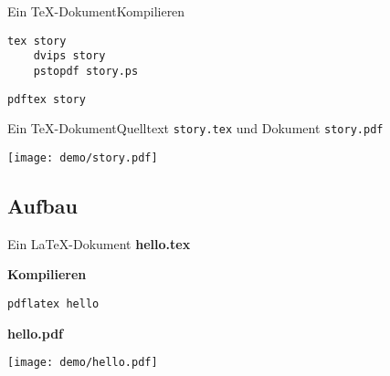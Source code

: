 \begin{Frame}[fragile]{Ein \TeX-Dokument}{Kompilieren}
  \begin{lstlisting}[language={},morekeywords={tex,dvips,pstopdf},gobble=4]
    tex story
    dvips story
    pstopdf story.ps
  \end{lstlisting}

  \xxx
  \pause


  \begin{lstlisting}[language={},morekeywords={pdftex},gobble=4]
    pdftex story
  \end{lstlisting}
\end{Frame}

\begin{Frame}[t]{Ein \TeX-Dokument}{Quelltext \texttt{story.tex} und Dokument \texttt{story.pdf}}
  

  \begin{center}
    \texttt{[image: demo/story.pdf]}
  \end{center}
\end{Frame}

\subsection{Aufbau}

\begin{Frame}[fragile,t]{Ein \LaTeX-Dokument}
  \textbf{\ttfamily\color{maincolor}hello.tex}
  

  \pause
  \xxx

  \textbf{\color{maincolor}Kompilieren}
  \begin{lstlisting}[language={},morekeywords={pdflatex},gobble=4]
    pdflatex hello
  \end{lstlisting}

  \pause
  \xxx

  \textbf{\ttfamily\color{maincolor}hello.pdf}
  \begin{center}
    \texttt{[image: demo/hello.pdf]}
  \end{center}
\end{Frame}

